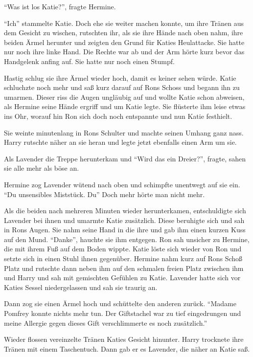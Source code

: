 \enquote{Was ist los Katie?}, fragte Hermine.

\enquote{Ich\abs} stammelte Katie. Doch ehe sie weiter machen konnte, um ihre Tränen aus dem Gesicht zu wischen, rutschten ihr, als sie ihre Hände nach oben nahm, ihre beiden Ärmel herunter und zeigten den Grund für Katies Heulattacke. Sie hatte nur noch ihre linke Hand. Die Rechte war ab und der Arm hörte kurz bevor das Handgelenk anfing auf. Sie hatte nur noch einen Stumpf.

Hastig schlug sie ihre Ärmel wieder hoch, damit es keiner sehen würde. Katie schluchzte noch mehr und saß kurz darauf auf Rons Schoss und begann ihn zu umarmen. Dieser riss die Augen ungläubig auf und wollte Katie schon abweisen, als Hermine seine Hände ergriff und um Katie legte. Sie flüsterte ihm leise etwas ins Ohr, worauf hin Ron sich doch noch entspannte und nun Katie festhielt.

Sie weinte minutenlang in Rons Schulter und machte seinen Umhang ganz nass. Harry rutschte näher an sie heran und legte jetzt ebenfalls einen Arm um sie.

Als Lavender die Treppe herunterkam und \enquote{Wird das ein Dreier?}, fragte, sahen sie alle mehr als böse an.

Hermine zog Lavender wütend nach oben und schimpfte unentwegt auf sie ein. \enquote{Du unsensibles Miststück. Du\abs} Doch mehr hörte man nicht mehr.

Als die beiden nach mehreren Minuten wieder herunterkamen, entschuldigte sich Lavender bei ihnen und umarmte Katie zusätzlich. Diese beruhigte sich und sah in Rons Augen. Sie nahm seine Hand in die ihre und gab ihm einen kurzen Kuss auf den Mund. \enquote{Danke}, hauchte sie ihm entgegen. Ron sah unsicher zu Hermine, die mit ihrem Fuß auf dem Boden wippte. Katie löste sich wieder von Ron und setzte sich in einen Stuhl ihnen gegenüber. Hermine nahm kurz auf Rons Schoß Platz und rutschte dann neben ihm auf den schmalen freien Platz zwischen ihm und Harry und sah mit gemischten Gefühlen zu Katie. Lavender hatte sich vor Katies Sessel niedergelassen und sah sie traurig an.

Dann zog sie einen Ärmel hoch und schüttelte den anderen zurück. \enquote{Madame Pomfrey konnte nichts mehr tun. Der Giftstachel war zu tief eingedrungen und meine Allergie gegen dieses Gift verschlimmerte es noch zusätzlich.}

Wieder flossen vereinzelte Tränen Katies Gesicht hinunter. Harry trocknete ihre Tränen mit einem Taschentuch. Dann gab er es Lavender, die näher an Katie saß.

